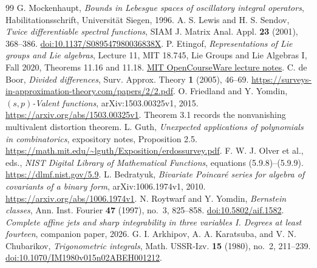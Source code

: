 \documentclass[11pt]{amsart}
\theoremstyle{definition}
\theoremstyle{remark}
\numberwithin{equation}{section}
\begin{document}
\begin{thebibliography}{99}
 G. Mockenhaupt, \emph{Bounds in Lebesgue spaces of oscillatory integral operators}, Habilitationsschrift, Universit\"at Siegen, 1996.
 A. S. Lewis and H. S. Sendov, \emph{Twice differentiable spectral functions}, SIAM J. Matrix Anal. Appl. \textbf{23} (2001), 368--386. \href{https://doi.org/10.1137/S089547980036838X}{doi:10.1137/S089547980036838X}.
 P. Etingof, \emph{Representations of Lie groups and Lie algebras}, Lecture 11, MIT 18.745, Lie Groups and Lie Algebras I, Fall 2020, Theorems 11.16 and 11.18. \href{https://ocw.mit.edu/courses/18-745-lie-groups-and-lie-algebras-i-fall-2020/mit18_745_f20_lec11.pdf}{MIT OpenCourseWare lecture notes}.
 C. de Boor, \emph{Divided differences}, Surv. Approx. Theory \textbf{1} (2005), 46--69. \url{https://surveys-in-approximation-theory.com/papers/2/2.pdf}.
 O. Friedland and Y. Yomdin, \emph{$(s,p)$-Valent functions}, arXiv:1503.00325v1, 2015. \url{https://arxiv.org/abs/1503.00325v1}. Theorem 3.1 records the nonvanishing multivalent distortion theorem.
 L. Guth, \emph{Unexpected applications of polynomials in combinatorics}, expository notes, Proposition 2.5. \url{https://math.mit.edu/~lguth/Exposition/erdossurvey.pdf}.
 F. W. J. Olver et al., eds., \emph{NIST Digital Library of Mathematical Functions}, equations (5.9.8)--(5.9.9). \url{https://dlmf.nist.gov/5.9}.
 L. Bedratyuk, \emph{Bivariate Poincar\'e series for algebra of covariants of a binary form}, arXiv:1006.1974v1, 2010. \url{https://arxiv.org/abs/1006.1974v1}.
 N. Roytwarf and Y. Yomdin, \emph{Bernstein classes}, Ann. Inst. Fourier \textbf{47} (1997), no.~3, 825--858. \href{https://doi.org/10.5802/aif.1582}{doi:10.5802/aif.1582}.
 \emph{Complete affine jets and sharp integrability in three variables I. Degrees at least fourteen}, companion paper, 2026.
 G. I. Arkhipov, A. A. Karatsuba, and V. N. Chubarikov, \emph{Trigonometric integrals}, Math. USSR-Izv. \textbf{15} (1980), no.~2, 211--239. \href{https://doi.org/10.1070/IM1980v015n02ABEH001212}{doi:10.1070/IM1980v015n02ABEH001212}.
\end{thebibliography}
\end{document}
